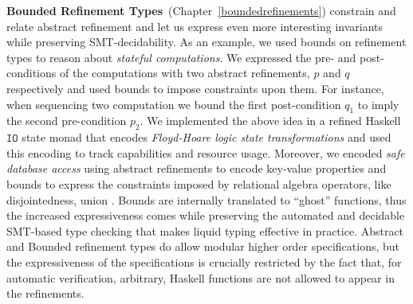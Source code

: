 \textbf{Bounded Refinement Types}~(Chapter~\ref{boundedrefinements})
constrain and relate abstract refinement and let us express even more interesting invariants
while preserving SMT-decidability.
%
As an example, we used bounds on refinement types to 
reason about \textit{stateful computations}.
We expressed the pre- and post-conditions of the computations with 
two abstract refinements, $p$ and $q$ respectively and used bounds to impose constraints upon them. 
For instance, when sequencing two computation we bound the first post-condition $q_1$ to imply 
the second pre-condition $p_2$.
%
%
We implemented the above idea in a refined Haskell $\texttt{IO}$ state monad that 
encodes \textit{Floyd-Hoare logic state transformations}
and used this encoding to track capabilities and resource usage. 
Moreover, we encoded \textit{safe database access} using 
abstract refinements to encode key-value properties 
and bounds to express the constraints imposed by 
relational algebra operators, like disjointedness, union \etc. 
%
Bounds are internally translated to ``ghost'' functions, 
thus the increased expressiveness comes while preserving the automated
and decidable SMT-based type checking 
that makes liquid typing effective in practice.
%
Abstract and Bounded refinement types 
do allow modular higher order specifications, 
but the expressiveness of the specifications is crucially 
restricted by the fact that, 
for automatic verification, arbitrary, Haskell functions are not allowed to 
appear in the refinements.

